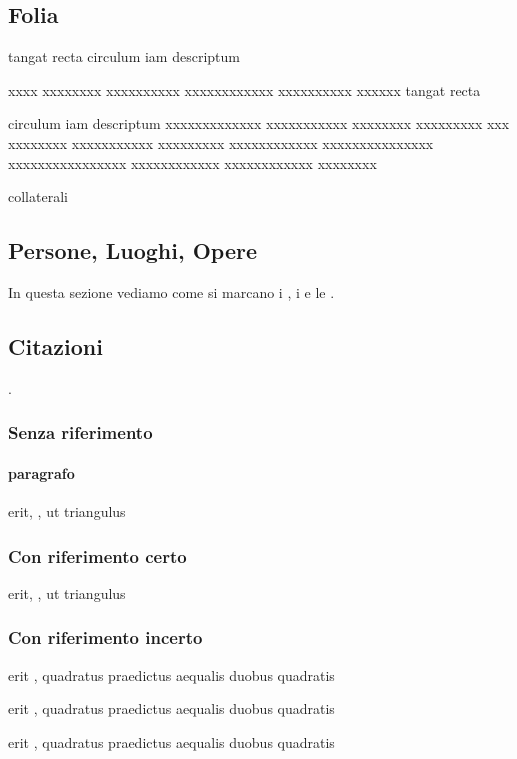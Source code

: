\documentclass[12pt]{book}
\begin{document}
\subsection{Folia}
\par
tangat recta  circulum iam descriptum \par
xxxx xxxxxxxx xxxxxxxxxx xxxxxxxxxxxx xxxxxxxxxx xxxxxx tangat recta \par {}
circulum iam descriptum xxxxxxxxxxxxx xxxxxxxxxxx xxxxxxxx xxxxxxxxx xxx   xxxxxxxx xxxxxxxxxxx
xxxxxxxxx xxxxxxxxxxxx xxxxxxxxxxxxxxx xxxxxxxxxxxxxxxx xxxxxxxxxxxx xxxxxxxxxxxx xxxxxxxx\par
collaterali
\par
\subsection{Persone, Luoghi, Opere}
\par
In questa sezione vediamo come si marcano i , i
 e le .
\par
\subsection{Citazioni}
\par
{}.
\par
\subsubsection{Senza riferimento}
\par
\par
\paragraph{paragrafo}
\par
\label{etichetta}
\par
erit, , ut triangulus
\par
\subsubsection{Con riferimento certo}
\par
erit, , ut triangulus
\par
\subsubsection{Con riferimento incerto}
\par
erit , quadratus praedictus aequalis duobus quadratis
\par
erit , quadratus praedictus aequalis duobus quadratis
\par
erit , quadratus praedictus aequalis duobus quadratis
\par
\end{document}
